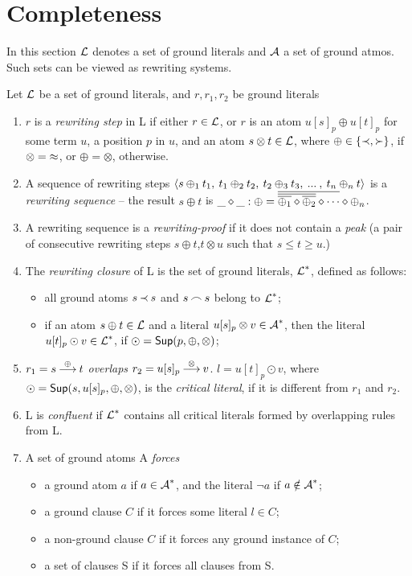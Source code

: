 \section{Completeness} \label{se:completeness}
In this section $\mbox {$\cal L$}$ denotes a set of ground literals and $\mbox {$\cal A$}$ a set of ground atmos.
Such sets can be viewed as rewriting systems.
\begin{definition}\label{def:forcing}
Let $\mbox {$\cal L$}$ be a set of ground literals, and $r,r_1,r_2$ be ground literals
\begin{enumerate}\smallerspaces
\item 
$r$ is a {\em rewriting step} in \C L if either \(r\in\mbox {$\cal L$}\), or
$r$ is an atom \(u[s]_p\oplus u[t]_p\) for some term $u$, a position $p$ in
$u$, and an atom \(s\otimes t\in \mbox {$\cal L$}\), where \(\oplus\in\{\mathbin{\prec},\mathbin{\succ}\}\),
if $\otimes=\mathbin{\approx}$, or $\oplus=\otimes$, otherwise.
\item
A sequence of rewriting steps \(\langle s\oplus_1 t_1,\: t_1\oplus_2 t_2,\:
t_2\oplus_3t_3,\: ...\:,\:t_n\oplus_n t\rangle\) is a {\em rewriting
sequence} -- the result \(s\oplus t\) is
\(\_\diamond\_ : \oplus=\overline{\overline{\overline{\oplus _1}\diamond\overline{\oplus _2}}\diamond\cdots}\diamond\oplus _n\).
\item
A rewriting sequence is a {\em rewriting-proof} if it does not contain a {\em
peak}
(a pair of consecutive rewriting steps \(s\oplus t\),\(t\otimes u\) such that \(s\leq
t\geq u\).)
\item
The {\em rewriting closure} of \C L is the
set of ground literals, $\mbox {$\cal L$}^\ast$, defined as follows:
\begin{itemize}\smallerspaces
\item  all ground atoms  $s\mathbin{\prec} s$ and $s\mathbin{\frown} s$ belong to $\mbox {$\cal L$}^\ast$;
\item if an atom \(s\oplus t\in\mbox {$\cal L$}\) and a literal \(u[s]_p\otimes v\in\mbox {$\cal A$}^\ast\), then the literal \(u[t]_p\odot v\in\mbox {$\cal L$}^\ast\), if
  \(\odot=\mbox {\sf Sup}(p,\oplus,\otimes)\);
\end{itemize}
%
\item
\(r_1 = s\mathbin {\stackrel {\oplus}{\longrightarrow}} t\) {\em overlaps} \(r_2 = u[s]_p \mathbin {\stackrel {\otimes}{\longrightarrow}} v\). 
\(l = u[t]_p \odot v\), where \(\odot = \mbox {\sf Sup}(s,u[s]_p,\oplus,\otimes)\), 
is the {\em critical literal}, if it is different from \(r_1\)
and \(r_2\).
\item
\C L  is {\em confluent} if \(\mbox {$\cal L$}^\ast\)
contains all critical literals formed by overlapping rules from \C L.
\item
A set of ground atoms \C A {\em forces}
\begin{itemize}\smallerspaces
\item a ground atom  $a$ if \(a\in\mbox {$\cal A$}^\ast\), and the literal \(\neg a\) if 
\(a\notin \mbox {$\cal A$}^\ast\);
\item a ground clause $C$ if it forces some literal \(l\in C\);
\item a non-ground clause $C$ if it forces any ground instance of $C$;
\item a set of clauses \C S if it forces all clauses from \C S.
\end{itemize}
\end{enumerate}
\end{definition}
